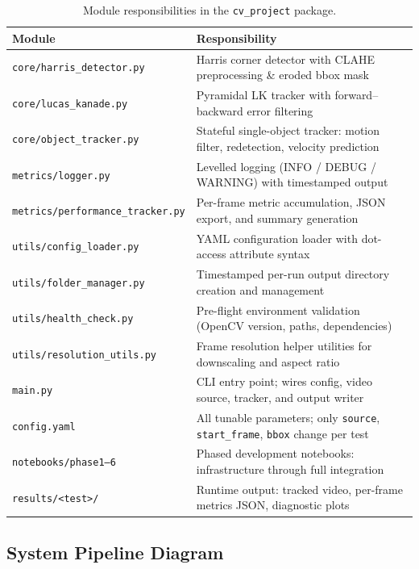 \documentclass[12pt,a4paper]{article}
\begin{document}
\begin{table}[H]
\centering
\caption{Module responsibilities in the \texttt{cv\_project} package.}
\label{tab:modules}
\small
\renewcommand{\arraystretch}{1.12}
\begin{tabularx}{\textwidth}{lX}
\toprule
\rowcolor{accentteal!20}
\textbf{Module} & \textbf{Responsibility} \\
\midrule
\texttt{core/harris\_detector.py} & Harris corner detector with CLAHE preprocessing \& eroded bbox mask \\
\texttt{core/lucas\_kanade.py} & Pyramidal LK tracker with forward--backward error filtering \\
\texttt{core/object\_tracker.py} & Stateful single-object tracker: motion filter, redetection, velocity prediction \\
\texttt{metrics/logger.py} & Levelled logging (INFO / DEBUG / WARNING) with timestamped output \\
\texttt{metrics/performance\_tracker.py} & Per-frame metric accumulation, JSON export, and summary generation \\
\texttt{utils/config\_loader.py} & YAML configuration loader with dot-access attribute syntax \\
\texttt{utils/folder\_manager.py} & Timestamped per-run output directory creation and management \\
\texttt{utils/health\_check.py} & Pre-flight environment validation (OpenCV version, paths, dependencies) \\
\texttt{utils/resolution\_utils.py} & Frame resolution helper utilities for downscaling and aspect ratio \\
\texttt{main.py} & CLI entry point; wires config, video source, tracker, and output writer \\
\texttt{config.yaml} & All tunable parameters; only \texttt{source}, \texttt{start\_frame}, \texttt{bbox} change per test \\
\texttt{notebooks/phase1--6} & Phased development notebooks: infrastructure through full integration \\
\texttt{results/<test>/} & Runtime output: tracked video, per-frame metrics JSON, diagnostic plots \\
\bottomrule
\end{tabularx}
\end{table}

\subsection{System Pipeline Diagram}
\end{document}
